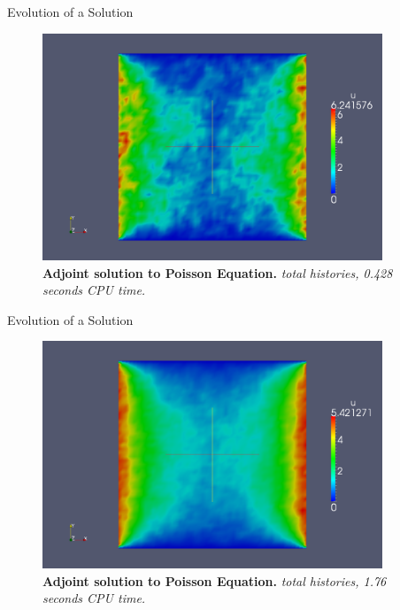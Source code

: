 \documentclass{beamer}
\begin{document}
\begin{frame}{Evolution of a Solution}

  \begin{figure}[h!]
    \begin{center}
      \includegraphics[width=4in]{adjoint_10000.png}
    \end{center}
    \caption{\textbf{Adjoint solution to Poisson Equation.}
      \textit{ total histories, 0.428 seconds CPU time.} }
  \end{figure}

\end{frame}

\begin{frame}{Evolution of a Solution}

  \begin{figure}[h!]
    \begin{center}
      \includegraphics[width=4in]{adjoint_100000.png}
    \end{center}
    \caption{\textbf{Adjoint solution to Poisson Equation.}
      \textit{ total histories, 1.76 seconds CPU time.} }
  \end{figure}

\end{frame}
\end{document}
